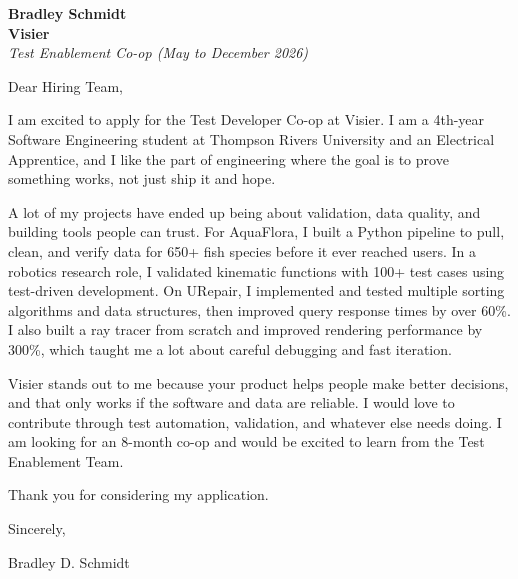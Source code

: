 \documentclass[11pt]{article}
\begin{document}
\textbf{Bradley Schmidt}\\
\vspace{0.5em}
\textbf{Visier}\\
\textit{Test Enablement Co-op (May to December 2026)}

Dear Hiring Team,

\par

I am excited to apply for the Test Developer Co-op at Visier. I am a 4th-year Software Engineering student at Thompson Rivers University and an Electrical Apprentice, and I like the part of engineering where the goal is to prove something works, not just ship it and hope.

\par

A lot of my projects have ended up being about validation, data quality, and building tools people can trust. For AquaFlora, I built a Python pipeline to pull, clean, and verify data for 650+ fish species before it ever reached users. In a robotics research role, I validated kinematic functions with 100+ test cases using test-driven development. On URepair, I implemented and tested multiple sorting algorithms and data structures, then improved query response times by over 60\%. I also built a ray tracer from scratch and improved rendering performance by 300\%, which taught me a lot about careful debugging and fast iteration.

\par

Visier stands out to me because your product helps people make better decisions, and that only works if the software and data are reliable. I would love to contribute through test automation, validation, and whatever else needs doing. I am looking for an 8-month co-op and would be excited to learn from the Test Enablement Team.

\par

Thank you for considering my application.

\par

Sincerely,

\par

Bradley D. Schmidt
\end{document}
